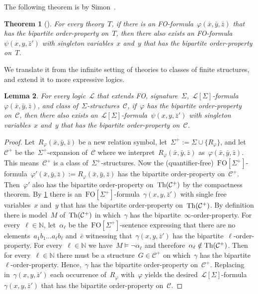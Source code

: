 \documentclass[11pt]{article}      \usepackage[margin=1in]{geometry}  \usepackage{microtype}
\newtheorem{theorem}{Theorem}[section]
\newtheorem{lemma}[theorem]{Lemma}
\theoremstyle{definition}
\newcommand{\N}[0]{\mathrm{\mathbb{N}}}
\renewcommand{\phi}{\varphi}
\newcommand{\LL}{\mathcal{L}}
\newcommand{\FO}{\mathrm{FO}}
\newcommand{\CC}{\mathcal{C}}
\begin{document}
The following theorem is by Simon~\cite{simon2021note}. 
\begin{theorem}[\cite{simon2021note}]\label{thm:simon}
    For every theory~$T$, if there is an FO-formula~$\phi(\bar x, \bar y, \bar z)$ that has the bipartite order-property on~$T$, then there also exists an FO-formula~$\psi(x,y,\bar z')$ with singleton variables~$x$ and~$y$ that has the bipartite order-property on~$T$.
\end{theorem}
We translate it from the infinite setting of theories to classes of finite structures, and extend it to more expressive logics.



\begin{lemma}\label{lem:singletons}
    For every logic~$\LL$ that extends FO, signature~$\Sigma$,~$\LL[\Sigma]$-formula~$\phi(\bar x, \bar y, \bar z)$, and class of~$\Sigma$-structures~$\CC$, if~$\phi$ has the bipartite order-property on~$\CC$, then there also exists an~$\LL[\Sigma]$-formula~$\psi(x,y,\bar z')$ with singleton variables~$x$ and~$y$ that has the bipartite order-property on~$\CC$.
\end{lemma}

\begin{proof}
    Let~$R_\phi(\bar x, \bar y, \bar z)$ be a new relation symbol, let~$\Sigma^+ := \Sigma \cup \{ R_\phi \}$, and let~$\CC^+$ be the~$\Sigma^+$-expansion of~$\CC$ where we interpret~$R_\phi(\bar x, \bar y, \bar z)$ as~$\phi(\bar x, \bar y, \bar z)$. This means~$\CC^+$ is a class of~$\Sigma^+$-structures.
    Now the (quantifier-free)~$\FO[\Sigma^+]$-formula~$\phi'(\bar x, \bar y, \bar z) := R_\phi(\bar x, \bar y, \bar z)$ has the bipartite order-property on~$\CC^+$.
    Then~$\phi'$ also has the bipartite order-property on~$\Th(\CC^+)$ by the compactness theorem.
    By \cref{thm:simon} there is an~$\FO[\Sigma^+]$-formula~$\gamma(x,y,\bar z')$ with single free variables~$x$ and~$y$ that has the bipartite order-property on~$\Th(\CC^+)$. 
    By definition there is model~$M$ of~$\Th(\CC^+)$ in which~$\gamma$ has the bipartite~$\infty$-order-property.
    For every~$\ell \in \N$, let~$\alpha_\ell$ be the~$\FO[\Sigma^+]$-sentence expressing that there are no elements~$a_1b_1 \ldots a_\ell b_\ell$ and~$\bar c$ witnessing that~$\gamma(x,y,\bar z')$ has the bipartite~$\ell$-order-property.
    For every~$\ell\in\N$ we have~$M\models \neg \alpha_\ell$ and therefore~$\alpha_\ell \notin \Th(\CC^+)$.
    Then for every~$\ell \in \N$ there must be a structure~$G \in \CC^+$ on which~$\gamma$ has the bipartite~$\ell$-order-property.
    Hence,~$\gamma$ has the bipartite order-property on~$\CC^+$.
    Replacing in~$\gamma(x,y, \bar z')$ each occurrence of~$R_\phi$ with~$\phi$ yields the desired~$\LL[\Sigma]$-formula~$\gamma(x,y, \bar z')$ that has the bipartite order-property on~$\CC$.
\end{proof}
\end{document}
